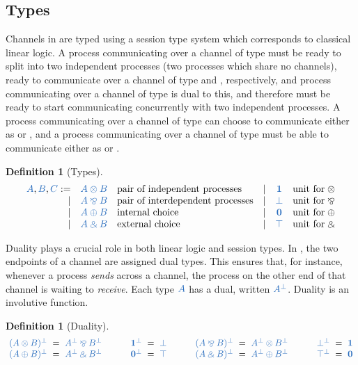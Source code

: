 \documentclass[submission,copyright,creativecommons]{eptcs}
\newtheorem{definition}[lemma]{Definition}
\begin{document}
\subsection{Types}
Channels in \cp are typed using a session type system which corresponds to classical linear logic. A process communicating over a channel of type  must be ready to split into two independent processes (two processes which share no channels), ready to communicate over a channel of type  and , respectively, and process communicating over a channel of type  is dual to this, and therefore must be ready to start communicating concurrently with two independent processes. A process communicating over a channel of type  can choose to communicate either as  or , and a process communicating over a channel of type  must be able to communicate either as  or .
\begin{definition}[Types]\label{def:cp-types}
  \[
    \begin{array}{rclrcl}
      \ty{A}, \ty{B}, \ty{C}
           :=& \ty{A \tens B} &\text{pair of independent processes}
      &  \mid& \ty{\one}      &\text{unit for} \; {\tens}
      \\ \mid& \ty{A \parr B} &\text{pair of interdependent processes}
      &  \mid& \ty{\bot}      &\text{unit for} \; {\parr}
      \\ \mid& \ty{A \plus B} &\text{internal choice}
      &  \mid& \ty{\nil}      &\text{unit for} \; {\plus}
      \\ \mid& \ty{A \with B} &\text{external choice}
      &  \mid& \ty{\top}      &\text{unit for} \; {\with}
    \end{array}
  \]
\end{definition}\noindent
Duality plays a crucial role in both linear logic and session types. In \cp, the two endpoints of a channel are assigned dual types. This ensures that, for instance, whenever a process \emph{sends} across a channel, the process on the other end of that channel is waiting to \emph{receive}. Each type $\ty{A}$ has a dual, written $\ty{A^\bot}$. Duality is an involutive function.
\begin{definition}[Duality]\label{def:cp-negation}
  \[
    \setlength{\arraycolsep}{3pt}
    \begin{array}{lclclclclclclcl}
               \ty{(A \tens B)^\bot} & = & \ty{A^\bot \parr B^\bot}
      &\qquad& \ty{\one^\bot}        & = & \ty{\bot}
      &\qquad& \ty{(A \parr B)^\bot} & = & \ty{A^\bot \tens B^\bot}
      &\qquad& \ty{\bot^\bot}        & = & \ty{\one}
      \\       \ty{(A \plus B)^\bot} & = & \ty{A^\bot \with B^\bot}
      &\qquad& \ty{\nil^\bot}        & = & \ty{\top}
      &\qquad& \ty{(A \with B)^\bot} & = & \ty{A^\bot \plus B^\bot}
      &\qquad& \ty{\top^\bot}        & = & \ty{\nil}
    \end{array}
  \]
\end{definition}\noindent
\end{document}
